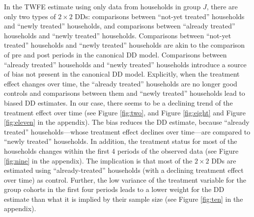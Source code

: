 \documentclass[12pt]{article}
\begin{document}
In the TWFE estimate using only data from households in group $J$, there are only two types of $2 \times 2$ DDs: comparisons between \enquote{not-yet treated} households and \enquote{newly treated} households, and comparisons between \enquote{already treated} households and \enquote{newly treated}  households. Comparisons between \enquote{not-yet treated} households and \enquote{newly treated} households are akin to the comparison of pre and post periods in the canonical DD model. Comparisons between \enquote{already treated} households and \enquote{newly treated} households introduce a source of bias not present in the canonical DD model. Explicitly, when the treatment effect changes over time, the \enquote{already treated} households are no longer good controls and comparisons between them and \enquote{newly treated} households lead to biased DD estimates. In our case, there seems to be a declining trend of the treatment effect over time (see Figure \ref{fig:two}, and Figure \ref{fig:eight} and Figure \ref{fig:eleven} in the appendix). The bias reduces the DD estimate, because \enquote{already treated} households---whose treatment effect declines over time---are compared to \enquote{newly treated} households. In addition, the treatment status for most of the households changes within the first 4 periods of the observed data (see Figure \ref{fig:nine} in the appendix). The implication is that most of the  $2 \times 2$ DDs are estimated using \enquote{already-treated} households (with a declining treatment effect over time) as control. Further, the low variance of the treatment variable for the group cohorts in the first four periods leads to a lower weight for the DD estimate than what it is implied by their sample size (see Figure \ref{fig:ten} in the appendix).
\end{document}
